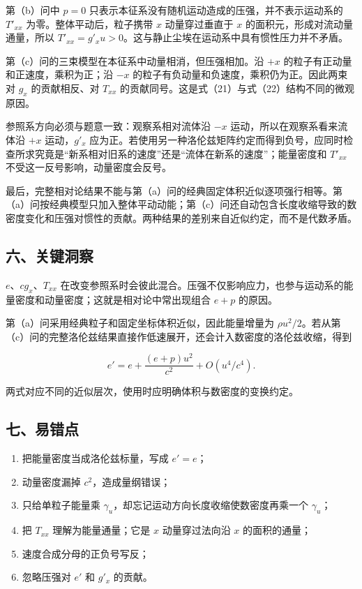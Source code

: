 \documentclass[12pt,a4paper,UTF8]{ctexart}
\newcommand{\tightlist}{\setlength{\itemsep}{0pt}\setlength{\parskip}{0pt}}
\begin{document}
第（b）问中 \(p=0\) 只表示本征系没有随机运动造成的压强，并不表示运动系的
\(T'_{xx}\) 为零。整体平动后，粒子携带 \(x\) 动量穿过垂直于 \(x\)
的面积元，形成对流动量通量，所以
\(T'_{xx}=g'_xu>0\)。这与静止尘埃在运动系中具有惯性压力并不矛盾。

第（c）问的三束模型在本征系中动量相消，但压强相加。沿 \(+x\)
的粒子有正动量和正速度，乘积为正；沿 \(-x\)
的粒子有负动量和负速度，乘积仍为正。因此两束对 \(g_x\) 的贡献相反、对
\(T_{xx}\) 的贡献同号。这是式（21）与式（22）结构不同的微观原因。

参照系方向必须与题意一致：观察系相对流体沿 \(-x\)
运动，所以在观察系看来流体沿 \(+x\) 运动，\(g'_x\)
应为正。若使用另一种洛伦兹矩阵约定而得到负号，应同时检查所求究竟是``新系相对旧系的速度''还是``流体在新系的速度''；能量密度和
\(T'_{xx}\) 不受这一反号影响，动量密度会反号。

最后，完整相对论结果不能与第（a）问的经典固定体积近似逐项强行相等。第（a）问按经典模型只加入整体平动动能；第（c）问还自动包含长度收缩导致的数密度变化和压强对惯性的贡献。两种结果的差别来自近似约定，而不是代数矛盾。

\subsection{六、关键洞察}\label{ux516dux5173ux952eux6d1eux5bdf-7}

\(e\)、\(cg_x\)、\(T_{xx}\)
在改变参照系时会彼此混合。压强不仅影响应力，也参与运动系的能量密度和动量密度；这就是相对论中常出现组合
\(e+p\) 的原因。

第（a）问采用经典粒子和固定坐标体积近似，因此能量增量为
\(\rho u^2/2\)。若从第（c）问的完整洛伦兹结果直接作低速展开，还会计入数密度的洛伦兹收缩，得到

\[
e'=e+\frac{(e+p)u^2}{c^2}+O(u^4/c^4).
\]

两式对应不同的近似层次，使用时应明确体积与数密度的变换约定。

\subsection{七、易错点}\label{ux4e03ux6613ux9519ux70b9-7}

\begin{enumerate}
\def\labelenumi{\arabic{enumi}.}
\tightlist
\item
  把能量密度当成洛伦兹标量，写成 \(e'=e\)；
\item
  动量密度漏掉 \(c^2\)，造成量纲错误；
\item
  只给单粒子能量乘 \(\gamma_u\)，却忘记运动方向长度收缩使数密度再乘一个
  \(\gamma_u\)；
\item
  把 \(T_{xx}\) 理解为能量通量；它是 \(x\) 动量穿过法向沿 \(x\)
  的面积的通量；
\item
  速度合成分母的正负号写反；
\item
  忽略压强对 \(e'\) 和 \(g'_x\) 的贡献。
\end{enumerate}
\end{document}
